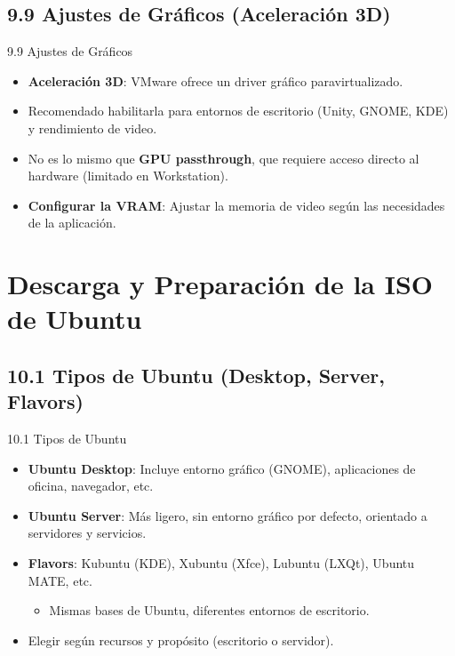 \documentclass{beamer}
\begin{document}
\subsection{9.9 Ajustes de Gráficos (Aceleración 3D)}
\begin{frame}{9.9 Ajustes de Gráficos}
    \begin{itemize}
        \item \textbf{Aceleración 3D}: VMware ofrece un driver gráfico paravirtualizado.
        \item Recomendado habilitarla para entornos de escritorio (Unity, GNOME, KDE) y rendimiento de video.
        \item No es lo mismo que \textbf{GPU passthrough}, que requiere acceso directo al hardware (limitado en Workstation).
        \item \textbf{Configurar la VRAM}: Ajustar la memoria de video según las necesidades de la aplicación.
    \end{itemize}
\end{frame}

\section{Descarga y Preparación de la ISO de Ubuntu}

\subsection{10.1 Tipos de Ubuntu (Desktop, Server, Flavors)}
\begin{frame}{10.1 Tipos de Ubuntu}
    \begin{itemize}
        \item \textbf{Ubuntu Desktop}: Incluye entorno gráfico (GNOME), aplicaciones de oficina, navegador, etc.
        \item \textbf{Ubuntu Server}: Más ligero, sin entorno gráfico por defecto, orientado a servidores y servicios.
        \item \textbf{Flavors}: Kubuntu (KDE), Xubuntu (Xfce), Lubuntu (LXQt), Ubuntu MATE, etc.  
        \begin{itemize}
            \item Mismas bases de Ubuntu, diferentes entornos de escritorio.
        \end{itemize}
        \item Elegir según recursos y propósito (escritorio o servidor).
    \end{itemize}
\end{frame}
\end{document}
